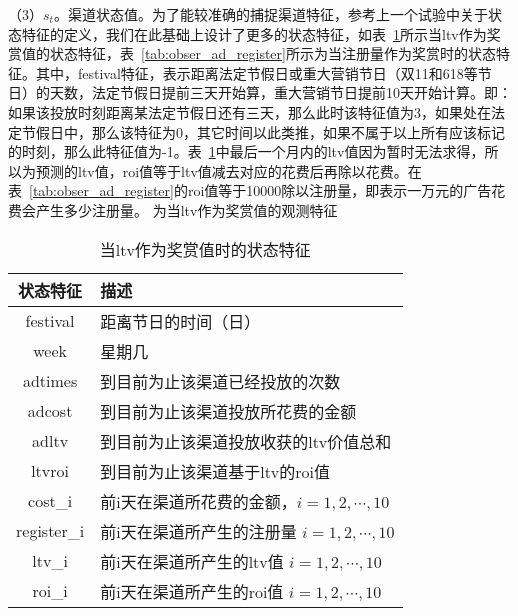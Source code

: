（3）$s_{t}$。渠道状态值。为了能较准确的捕捉渠道特征，参考上一个试验中关于状态特征的定义，我们在此基础上设计了更多的状态特征，如表~\ref{tab:obser_ad_ltv}所示当ltv作为奖赏值的状态特征，表~\ref{tab:obser_ad_register}所示为当注册量作为奖赏时的状态特征。其中，festival特征，表示距离法定节假日或重大营销节日（双11和618等节日）的天数，法定节假日提前三天开始算，重大营销节日提前10天开始计算。即：如果该投放时刻距离某法定节假日还有三天，那么此时该特征值为3，如果处在法定节假日中，那么该特征为0，其它时间以此类推，如果不属于以上所有应该标记的时刻，那么此特征值为-1。表~\ref{tab:obser_ad_ltv}中最后一个月内的ltv值因为暂时无法求得，所以为预测的ltv值，roi值等于ltv值减去对应的花费后再除以花费。在表~\ref{tab:obser_ad_register}的roi值等于10000除以注册量，即表示一万元的广告花费会产生多少注册量。
为当ltv作为奖赏值的观测特征
\begin{table}[htbp]
  \centering
  \caption{当ltv作为奖赏值时的状态特征}
  \label{tab:obser_ad_ltv}
  \begin{tabular}{cl}
    \toprule
      状态特征 & 描述 \\
    \midrule
      festival & 距离节日的时间（日） \\
      week & 星期几 \\
      adtimes & 到目前为止该渠道已经投放的次数 \\
      adcost & 到目前为止该渠道投放所花费的金额 \\
      adltv & 到目前为止该渠道投放收获的ltv价值总和 \\
      ltvroi & 到目前为止该渠道基于ltv的roi值 \\
      cost_i & 前i天在渠道所花费的金额，$i=1,2,\cdots,10$ \\
      register_i & 前i天在渠道所产生的注册量 $i=1,2,\cdots,10$\\
      ltv_i & 前i天在渠道所产生的ltv值 $i=1,2,\cdots,10$\\
      roi_i & 前i天在渠道所产生的roi值 $i=1,2,\cdots,10$\\
    \bottomrule
  \end{tabular}
\end{table}

